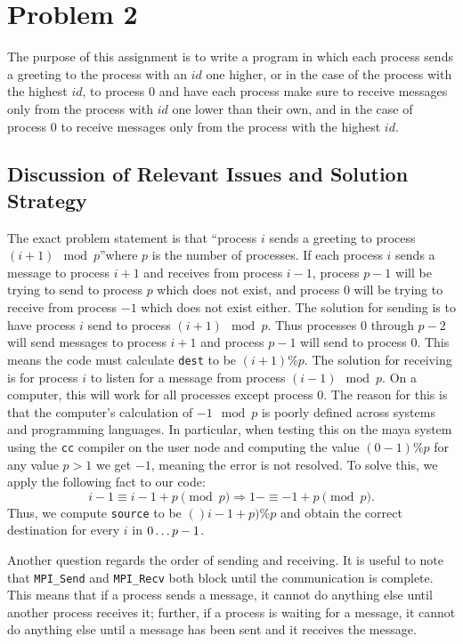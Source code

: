 \documentclass[11pt]{article}
\begin{document}
	
	

\pagebreak
\section{Problem 2}
The purpose of this assignment is to write a program in which each process sends a greeting to the process with an $id$ one higher, or in the case of the process with the highest $id$, to process $0$ and have each process make sure to receive messages only from the process with $id$ one lower than their own, and in the case of process $0$ to receive messages only from the process with the highest $id$.
\subsection{Discussion of Relevant Issues and Solution Strategy}
The exact problem statement is that \textquotedblleft process $i$ sends a greeting to process $(i+1)\mod p$\textquotedblright where $p$ is the number of processes. If each process $i$ sends a message to process $i+1$ and receives from process $i-1$, process $p-1$ will be trying to send to process $p$ which does not exist, and process $0$ will be trying to receive from process $-1$ which does not exist either. The solution for sending is to have process $i$ send to process $(i+1)\mod p$. Thus processes $0$ through $p-2$ will send messages to process $i+1$ and process $p-1$ will send to process $0$. This means the code must calculate \texttt{dest} to be $(i+1)\% p$. The solution for receiving is for process $i$ to listen for a message from process $(i-1)\mod p$. On a computer, this will work for all processes except process $0$. The reason for this is that the computer's calculation of $-1\mod p$ is poorly defined across systems and programming languages. In particular, when testing this on the maya system using the \texttt{cc} compiler on the user node and computing the value $(0-1) \% p$ for any value $p > 1$ we get $-1$, meaning the error is not resolved. To solve this, we apply the following fact to our code:
$$ i-1 \equiv i-1+p \pmod{p} \Longrightarrow 1- \equiv -1+p \pmod{p}. $$
Thus, we compute \texttt{source} to be $()i-1+p) \% p $ and obtain the correct destination for every $i$ in $0\mathellipsis p-1$.

Another question regards the order of sending and receiving. It is useful to note that \texttt{MPI\_Send} and \texttt{MPI\_Recv} both block until the communication is complete. This means that if a process sends a message, it cannot do anything else until another process receives it; further, if a process is waiting for a message, it cannot do anything else until a message has been sent and it receives the message.
\end{document}
